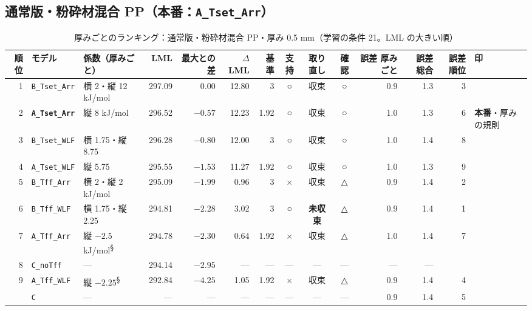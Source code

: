\documentclass[paper=a4paper,landscape,fontsize=10pt,line_length=62zw,number_of_lines=34]{jlreq}
\let\origtextbf\textbf
\renewcommand{\textbf}[1]{\origtextbf{\gtfamily #1}}   %
\begin{document}
\subsection{通常版・粉砕材混合 PP（本番：\texttt{A\_\allowbreak{}Tset\_\allowbreak{}Arr}）}
\begin{table}[H]\centering\footnotesize
\caption{厚みごとのランキング：通常版・粉砕材混合 PP・厚み 0.5 mm（学習の条件 21。LML の大きい順）}
\begin{tabular}{rlp{11\zw}rrrrccc rrrl}
\toprule
順位 & モデル & 係数（厚みごと） & LML & 最大との差 & $\Delta$LML & 基準 & 支持 & 取り直し & 確認 & 誤差 厚みごと & 誤差 総合 & 誤差順位 & 印 \\
\midrule
1 & \texttt{B\_\allowbreak{}Tset\_\allowbreak{}Arr} & 横 2・縦 12 kJ/mol & 297.09 & 0.00 & 12.80 & 3 & ○ & 収束 & ○ & 0.9 & 1.3 & 3 &  \\
2 & \textbf{\texttt{A\_\allowbreak{}Tset\_\allowbreak{}Arr}} & 縦 8 kJ/mol & 296.52 & $-0.57$ & 12.23 & 1.92 & ○ & 収束 & ○ & 1.0 & 1.3 & 6 & \textbf{本番}・厚みの規則 \\
3 & \texttt{B\_\allowbreak{}Tset\_\allowbreak{}WLF} & 横 1.75・縦 8.75 & 296.28 & $-0.80$ & 12.00 & 3 & ○ & 収束 & ○ & 1.0 & 1.4 & 8 &  \\
4 & \texttt{A\_\allowbreak{}Tset\_\allowbreak{}WLF} & 縦 5.75 & 295.55 & $-1.53$ & 11.27 & 1.92 & ○ & 収束 & ○ & 1.0 & 1.3 & 9 &  \\
5 & \texttt{B\_\allowbreak{}Tff\_\allowbreak{}Arr} & 横 2・縦 2 kJ/mol & 295.09 & $-1.99$ & 0.96 & 3 & × & 収束 & △ & 0.9 & 1.4 & 2 &  \\
6 & \texttt{B\_\allowbreak{}Tff\_\allowbreak{}WLF} & 横 1.75・縦 2.25 & 294.81 & $-2.28$ & 3.02 & 3 & ○ & \textbf{未収束} & △ & 0.9 & 1.4 & 1 &  \\
7 & \texttt{A\_\allowbreak{}Tff\_\allowbreak{}Arr} & 縦 $-2.5$ kJ/mol\textsuperscript{§} & 294.78 & $-2.30$ & 0.64 & 1.92 & × & 収束 & △ & 1.0 & 1.4 & 7 &  \\
8 & \texttt{C\_\allowbreak{}noTff} & --- & 294.14 & $-2.95$ & --- & --- & --- & --- & --- & --- & --- &  &  \\
9 & \texttt{A\_\allowbreak{}Tff\_\allowbreak{}WLF} & 縦 $-2.25$\textsuperscript{§} & 292.84 & $-4.25$ & 1.05 & 1.92 & × & 収束 & △ & 0.9 & 1.4 & 4 &  \\
 & \texttt{C} & --- & --- & --- & --- & --- & --- & --- & --- & 0.9 & 1.4 & 5 &  \\
\bottomrule
\end{tabular}
\end{table}
\end{document}
